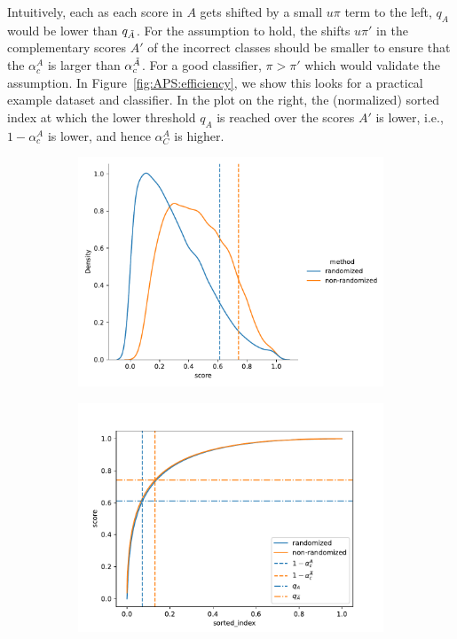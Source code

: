 Intuitively, each as each score in $A$ gets shifted by a small $u\pi$ term to the left, $q_A$ would be lower than $q_{\Tilde{A}}$.
For the assumption to hold, the shifts $u\pi'$ in the complementary scores $A'$ of the incorrect classes should be smaller to ensure that the $\alpha_c^A$ is larger than $\alpha_c^{\Tilde{A}}$.
For a good classifier, $\pi > \pi'$ which would validate the assumption. 
In Figure~\ref{fig:APS:efficiency}, we show this looks for a practical example dataset and classifier.
In the plot on the right, the (normalized) sorted index at which the lower threshold $q_A$ is reached over the scores $A'$ is lower, i.e., $1 - \alpha_c^A$ is lower, and hence $\alpha_C^A$ is higher.

\begin{figure}
    \begin{subfigure}{0.48\linewidth}
        \centering
        \includegraphics[width=\linewidth]{graphConformal/figures/aps_dist}
    \end{subfigure}
    \begin{subfigure}{0.48\linewidth}
        \centering
        \includegraphics[width=\linewidth]{graphConformal/figures/aps_sorted}

\end{subfigure}
\end{figure}
